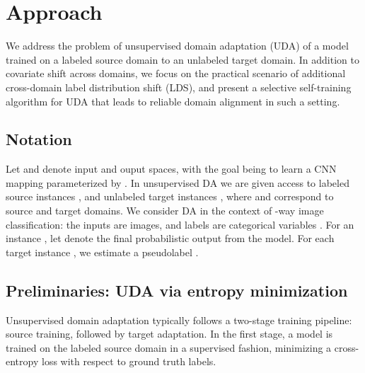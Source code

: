 \documentclass[10pt,twocolumn,letterpaper]{article}
\begin{document}
\section{Approach}
\label{sec:approach}
\vspace{-3pt}

We address the problem of unsupervised domain adaptation (UDA) of a model trained on a labeled source domain to an unlabeled target domain. In addition to covariate shift across domains, we focus on the practical scenario of additional cross-domain label distribution shift (LDS), and present a selective self-training algorithm for UDA that leads to reliable domain alignment in such a setting.


\vspace{-2pt}
\subsection{Notation}
\vspace{-2pt}


\noindent Let  and  denote input and ouput spaces, with the goal being to learn a CNN mapping  parameterized by . In unsupervised DA we are given access to labeled source instances , and unlabeled target instances , where  and  correspond to source and target domains. We consider DA in the context of -way image classification: the inputs  are images, and labels  are categorical variables . 
For an instance , let  denote the final probabilistic output from the model. For each target instance , we estimate a pseudolabel .

\vspace{-2pt}
\subsection{Preliminaries: UDA via entropy minimization}
\vspace{-2pt}

Unsupervised domain adaptation typically follows a two-stage training pipeline: source training, followed by target adaptation. In the first stage, a model is trained on the labeled source domain in a supervised fashion, minimizing a cross-entropy loss with respect to ground truth labels.

    
\vspace{-5pt}
\end{document}
